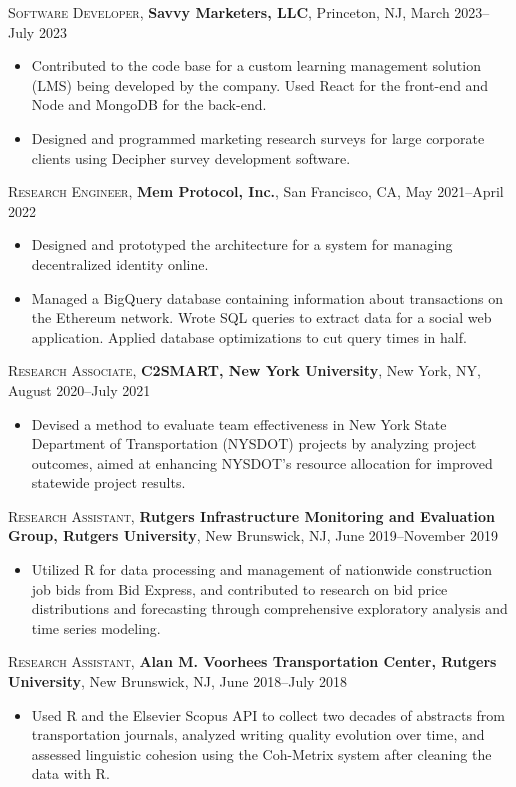 \documentclass[letterpaper,10pt]{article}
\begin{document}
\textsc{Software Developer}, \textbf{Savvy Marketers, LLC}, Princeton, NJ, March 2023--July 2023
\begin{itemize}
  \item Contributed to the code base for a custom learning management solution
        (LMS) being developed by the company. Used React for the front-end and
        Node and MongoDB for the back-end.
  \item Designed and programmed marketing research surveys for large corporate
        clients using Decipher survey development software.
\end{itemize}

\textsc{Research Engineer}, \textbf{Mem Protocol, Inc.}, San Francisco, CA, May 2021--April 2022
\begin{itemize}
  \item Designed and prototyped the architecture for a system for managing
        decentralized identity online.
  \item Managed a BigQuery database containing information about transactions on
        the Ethereum network. Wrote SQL queries to extract data for a social web
        application. Applied database optimizations to cut query times in half.
\end{itemize}

\textsc{Research Associate}, \textbf{C2SMART, New York University}, New York, NY, August 2020--July 2021
\begin{itemize}
  \item Devised a method to evaluate team effectiveness in New York State Department of Transportation (NYSDOT) projects
        by analyzing project outcomes, aimed at enhancing NYSDOT's resource allocation for improved statewide project results.
\end{itemize}

\textsc{Research Assistant}, \textbf{Rutgers Infrastructure Monitoring and Evaluation Group, Rutgers University}, New Brunswick, NJ, June 2019--November 2019
\begin{itemize}
  \item Utilized R for data processing and management of nationwide construction job bids from Bid Express, and
        contributed to research on bid price distributions and forecasting through comprehensive exploratory analysis and time
        series modeling.
\end{itemize}

\textsc{Research Assistant}, \textbf{Alan M. Voorhees Transportation Center, Rutgers University}, New Brunswick, NJ, June 2018--July 2018
\begin{itemize}
  \item Used R and the Elsevier Scopus API to collect two decades of abstracts from transportation journals, analyzed
        writing quality evolution over time, and assessed linguistic cohesion using the Coh-Metrix system after cleaning the
        data with R.
\end{itemize}
\end{document}
